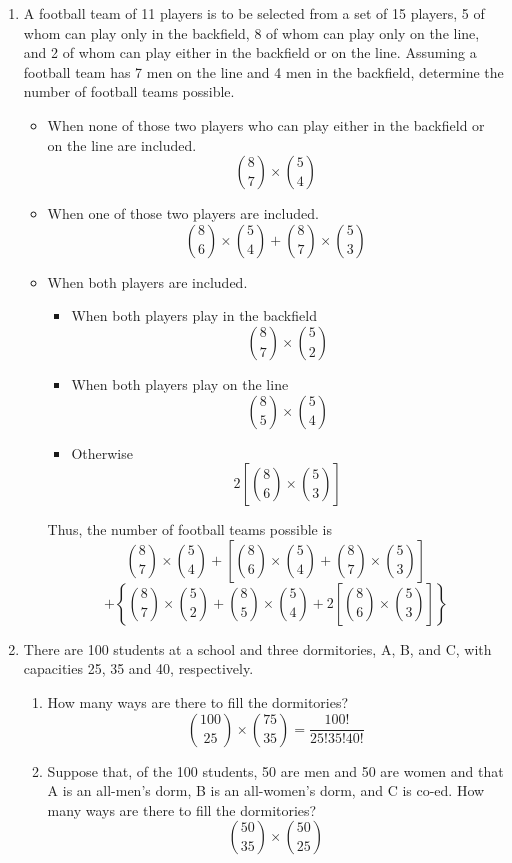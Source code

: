 \documentclass[12pt]{article}
\begin{document}
\begin{enumerate}
    \newpage
    \item A football team of 11 players is to be selected from a set of 15 players, 5 of whom can play only in the backfield, 8 of whom can play only on the line, and 2 of whom can play either in the backfield or on the line. Assuming a football team has 7 men on the line and 4 men in the backfield, determine the number of football teams possible.
    \begin{itemize}
        \item  When none of those two players who can play either in the backfield or on the line are included.
        $$\binom{8}{7}\times \binom{5}{4}$$
        \item When one of those two players are included.
        $$\binom{8}{6}\times\binom{5}{4}+\binom{8}{7}\times\binom{5}{3}$$
        \item When both players are included.
        \begin{itemize}
            \item When both players play in the backfield
            $$\binom{8}{7}\times \binom{5}{2}$$
            \item When both players play on the line
            $$\binom{8}{5}\times \binom{5}{4}$$
            \item Otherwise
            $$2\left[\binom{8}{6}\times \binom{5}{3}\right]$$
        \end{itemize}
        Thus, the number of football teams possible is
        $$\binom{8}{7}\times \binom{5}{4} + \left[\binom{8}{6}\times\binom{5}{4}+\binom{8}{7}\times\binom{5}{3}\right]$$
        $$+\left\{\binom{8}{7}\times \binom{5}{2}+\binom{8}{5}\times \binom{5}{4}+ 2\left[\binom{8}{6}\times \binom{5}{3}\right] \right\}$$
    \end{itemize}

    \newpage
    \item There are 100 students at a school and three dormitories, A, B, and C, with capacities 25, 35 and 40, respectively.
    \begin{enumerate}[label=(\alph*)]
        \item How many ways are there to fill the dormitories?
        $$\binom{100}{25}\times \binom{75}{35} = \frac{100!}{25!35!40!}$$
        \item Suppose that, of the 100 students, 50 are men and 50 are women and that A is an all-men's dorm, B is an all-women's dorm, and C is co-ed. How many ways are there to fill the dormitories?
        $$\binom{50}{35}\times\binom{50}{25}$$
    \end{enumerate}
    

\end{enumerate}
\end{document}
